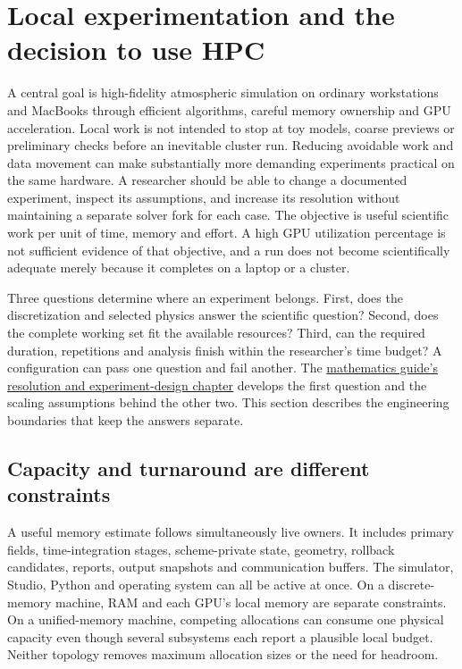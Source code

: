\section{Local experimentation and the decision to use HPC}
\label{architecture-local-experiments}

A central goal is high-fidelity atmospheric simulation on ordinary workstations
and MacBooks through efficient algorithms, careful memory ownership and GPU
acceleration. Local work is not intended to stop at toy models, coarse previews
or preliminary checks before an inevitable cluster run. Reducing avoidable
work and data movement can make substantially more demanding experiments
practical on the same hardware. A researcher
should be able to change a documented experiment, inspect its assumptions,
and increase its resolution without maintaining a separate solver fork for
each case. The objective is useful scientific work per unit of time, memory
and effort. A high GPU utilization percentage is not sufficient evidence of
that objective, and a run does not become scientifically adequate merely
because it completes on a laptop or a cluster.

Three questions determine where an experiment belongs. First, does the
discretization and selected physics answer the scientific question? Second,
does the complete working set fit the available resources? Third, can the
required duration, repetitions and analysis finish within the researcher's
time budget? A configuration can pass one question and fail another. The
\href{MATHEMATICS.pdf}{mathematics guide's resolution and experiment-design
chapter} develops the first question and the scaling assumptions behind the
other two. This section describes the engineering boundaries that keep the
answers separate.

\subsection{Capacity and turnaround are different constraints}

A useful memory estimate follows simultaneously live owners. It includes
primary fields, time-integration stages, scheme-private state, geometry,
rollback candidates, reports, output snapshots and communication buffers.
The simulator, Studio, Python and operating system can all be active at once.
On a discrete-memory machine, RAM and each GPU's local memory are separate
constraints. On a unified-memory machine, competing allocations can consume
one physical capacity even though several subsystems each report a plausible
local budget. Neither topology removes maximum allocation sizes or the need
for headroom.

